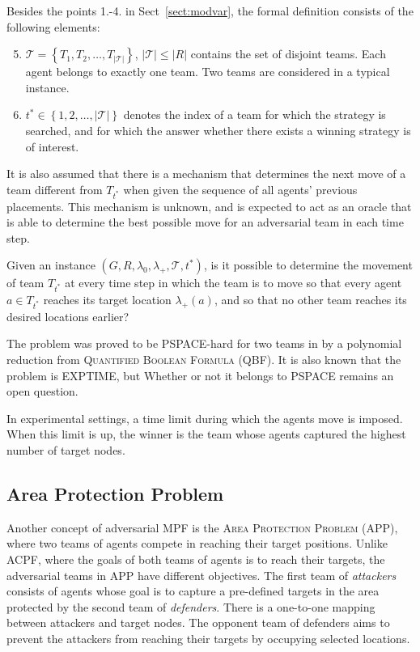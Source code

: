 Besides the points 1.-4. in Sect~\ref{sect:modvar}, the formal definition consists of the following elements:
\begin{enumerate}
		\setcounter{enumi}{4}
	\item $\mathcal{T}=\left\{T_1,T_2,\dots,T_{|\mathcal{T}|}\right\}$, $|\mathcal{T}|\leq|R|$ contains the set of disjoint teams.
		Each agent belongs to exactly one team. 
		Two teams are considered in a typical instance. 
	\item $t^*\in\left\{1,2,\dots,|\mathcal{T}|\right\}$ denotes the index of a team for which the strategy is searched, 
		and for which the answer whether there exists a winning strategy is of interest.
\end{enumerate}
It is also assumed that there is a mechanism that determines the next move of a team different from $T_{t^*}$ when given the sequence of all agents' previous placements. 
This mechanism is unknown, and is expected to act as an oracle that is able to determine the best possible move for an adversarial team in each time step.
\begin{problem}
Given an instance $(G,R,\lambda_0,\lambda_+,\mathcal{T},t^*)$, is it possible to determine the movement of team $T_{t^*}$ at every time step in which the team is to move 
so that every agent $a\in T_{t^*}$ reaches its target location $\lambda_+(a)$, and so that no other team reaches its desired locations earlier?
\end{problem}

The problem was proved to be PSPACE-hard for two teams in \cite{ivanova04} by a polynomial reduction from \textsc{Quantified Boolean Formula} (QBF).
It is also known that the problem is EXPTIME, but Whether or not it belongs to PSPACE remains an open question.

In experimental settings, a time limit during which the agents move is imposed.
When this limit is up, the winner is the team whose agents captured the highest number of target nodes.

\subsection{Area Protection Problem}

Another concept of adversarial MPF is the \textsc{Area Protection Problem} (APP), where two teams of agents compete in reaching their target positions. 
Unlike ACPF, where the goals of both teams of agents is to reach their targets, the adversarial teams in APP have different objectives. 
The first team of \emph{attackers} consists of agents whose goal is to capture a pre-defined targets in the area protected by the second team of \emph{defenders}. 
There is a one-to-one mapping between attackers and target nodes.
The opponent team of defenders aims to prevent the attackers from reaching their targets by occupying selected locations.

